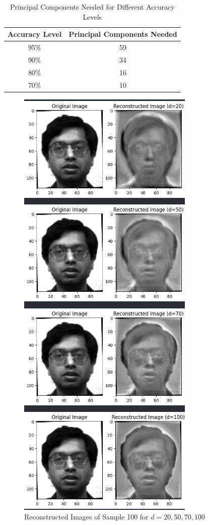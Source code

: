 \documentclass[conference]{IEEEtran}
\begin{document}
\begin{table}[h!]
\centering
\begin{tabular}{|c|c|}
\hline
\textbf{Accuracy Level} & \textbf{Principal Components Needed} \\ \hline
95\%                     & 59                                   \\ \hline
90\%                     & 34                                   \\ \hline
80\%                     & 16                                   \\ \hline
70\%                     & 10                                   \\ \hline
\end{tabular}
\caption{Principal Components Needed for Different Accuracy Levels}
\label{tab:principal_components}
\end{table}


\begin{figure}[htbp]
  \centerline{\includegraphics[scale=0.4]{figures/reconstructed_images.png}}
  \caption{Reconstructed Images of Sample 100 for $d=20,50,70,100$}
  \label{fig:reconstructed_images}
\end{figure}  
\end{document}
